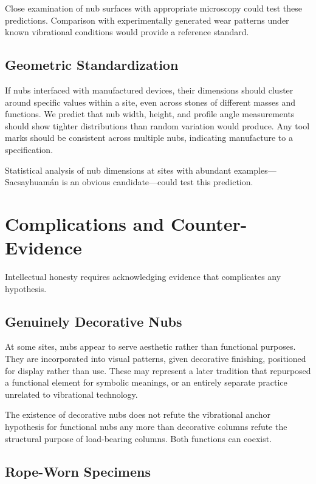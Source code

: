 \documentclass[11pt]{article}
\begin{document}
Close examination of nub surfaces with appropriate microscopy could test these predictions. Comparison with experimentally generated wear patterns under known vibrational conditions would provide a reference standard.

\subsection{Geometric Standardization}

If nubs interfaced with manufactured devices, their dimensions should cluster around specific values within a site, even across stones of different masses and functions. We predict that nub width, height, and profile angle measurements should show tighter distributions than random variation would produce. Any tool marks should be consistent across multiple nubs, indicating manufacture to a specification.

Statistical analysis of nub dimensions at sites with abundant examples—Sacsayhuamán is an obvious candidate—could test this prediction.

\section{Complications and Counter-Evidence}

Intellectual honesty requires acknowledging evidence that complicates any hypothesis.

\subsection{Genuinely Decorative Nubs}

At some sites, nubs appear to serve aesthetic rather than functional purposes. They are incorporated into visual patterns, given decorative finishing, positioned for display rather than use. These may represent a later tradition that repurposed a functional element for symbolic meanings, or an entirely separate practice unrelated to vibrational technology.

The existence of decorative nubs does not refute the vibrational anchor hypothesis for functional nubs any more than decorative columns refute the structural purpose of load-bearing columns. Both functions can coexist.

\subsection{Rope-Worn Specimens}
\end{document}
